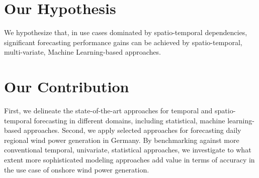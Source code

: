 \section{Our Hypothesis}
We hypothesize that, in use cases dominated by spatio-temporal dependencies, significant forecasting performance gains can be achieved by spatio-temporal, multi-variate, Machine Learning-based approaches.

\section{Our Contribution}
First, we delineate the state-of-the-art approaches for temporal and spatio-temporal forecasting in different domains, including statistical, machine learning-based approaches.
Second, we apply selected approaches for forecasting daily regional wind power generation in Germany.
By benchmarking against more conventional temporal, univariate, statistical approaches, we investigate to what extent more sophisticated modeling approaches add value in terms of accuracy in the use case of onshore wind power generation.